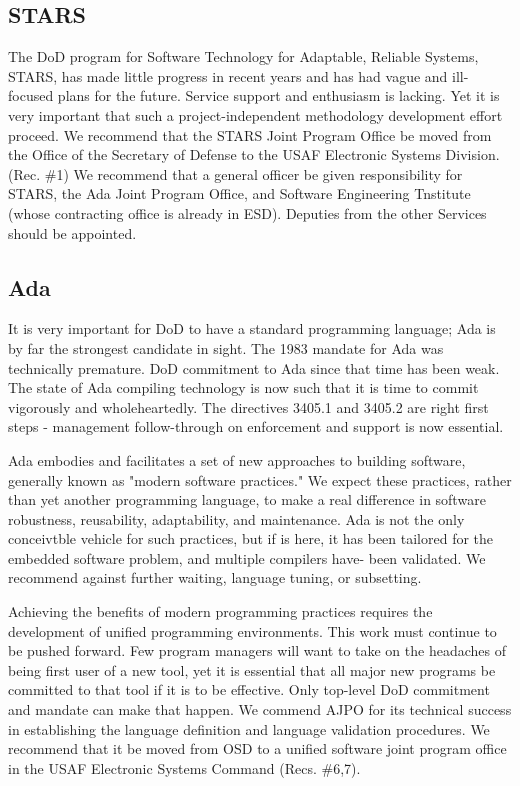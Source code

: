 \documentclass[12pt]{article}
\begin{document}
\subsection*{STARS}

The DoD program for Software Technology for Adaptable, Reliable Systems,
STARS, has made little progress in recent years and has had vague and
ill-focused plans for the future. Service support and enthusiasm is lacking.
Yet it is very important that such a project-independent methodology
development effort proceed. We recommend that the STARS Joint Program Office
be moved from the Office of the Secretary of Defense to the USAF Electronic
Systems Division. (Rec. \#1) We recommend that a general officer be given
responsibility for STARS, the Ada Joint Program Office, and Software
Engineering Tnstitute (whose contracting office is already in ESD). Deputies
from the other Services should be appointed.

\subsection*{Ada}

It is very important for DoD to have a standard programming language; Ada is
by far the strongest candidate in sight. The 1983 mandate for Ada was
technically premature. DoD commitment to Ada since that time has been weak.
The state of Ada compiling technology is now such that it is time to commit
vigorously and wholeheartedly.  The directives 3405.1 and 3405.2 are right
first steps - management follow-through on enforcement and support is now
essential.

Ada embodies and facilitates a set of new approaches to building software,
generally known as "modern software practices." We expect these practices,
rather than yet another programming language, to make a real difference in
software robustness, reusability, adaptability, and maintenance. Ada is not
the only conceivtble vehicle for such practices, but if is here, it has been
tailored for the embedded software problem, and multiple compilers have- been
validated. We recommend against further waiting, language tuning, or
subsetting.

Achieving the benefits of modern programming practices requires the development of
unified programming environments. This work must continue to be pushed forward.
Few program managers will want to take on the headaches of being first user of a new
tool, yet it is essential that all major new programs be committed to that tool if it is to
be effective. Only top-level DoD commitment and mandate can make that happen.
We commend AJPO for its technical success in establishing the language definition and
language validation procedures. We recommend that it be moved from OSD to a unified
software joint program office in the USAF Electronic Systems Command (Recs. \#6,7).
\end{document}
